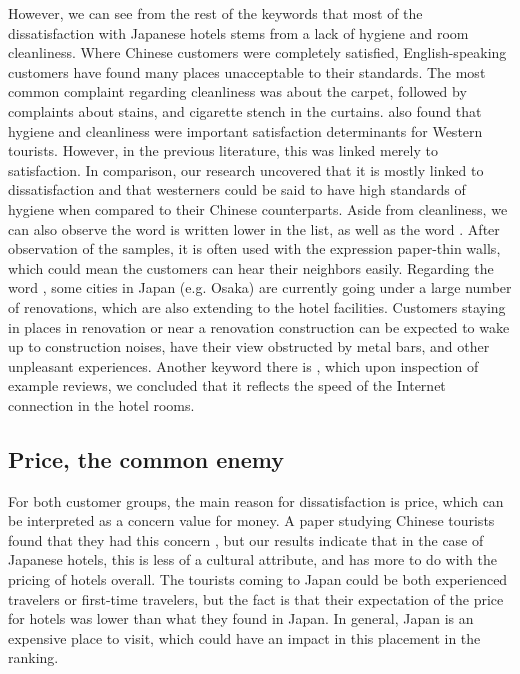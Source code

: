 However, we can see from the rest of the keywords \DIFdelbegin {}\DIFdelend that most of the dissatisfaction with Japanese hotels stems from a lack of hygiene and room cleanliness. Where Chinese customers were completely satisfied, English-speaking customers have found many places unacceptable to their standards. The most common complaint regarding cleanliness was about the carpet, followed by complaints about stains, and cigarette stench in the curtains. \cite{kozak2002} also found that hygiene and cleanliness were important satisfaction determinants for Western tourists. However, in the previous literature, this was linked merely to satisfaction. In comparison, our research uncovered that it is mostly linked to dissatisfaction and that westerners could be said to have high standards of hygiene when compared to their Chinese counterparts. Aside from cleanliness, we can also observe the word \DIFdelbegin {}\DIFdelend \DIFaddbegin {}\DIFaddend is written lower in the list, as well as the word \DIFdelbegin {}\DIFdelend \DIFaddbegin {}\DIFaddend . After observation of the samples, it is often used with the expression \DIFdelbegin {}\DIFdelend \DIFaddbegin {}\DIFaddend paper-thin walls\DIFdelbegin {}\DIFdelend \DIFaddbegin {}\DIFaddend , which could mean the customers can hear their neighbors easily. Regarding the word \DIFdelbegin {}\DIFdelend \DIFaddbegin {}\DIFaddend , some cities in Japan (e.g. Osaka) are currently going under a large number of renovations, which are also extending to the hotel facilities. Customers staying in places in renovation or near a renovation construction can be expected to wake up to construction noises, have their view obstructed by metal bars, and other unpleasant experiences. Another keyword there is \DIFdelbegin {}\DIFdelend \DIFaddbegin {}\DIFaddend , which upon inspection of example reviews, we concluded that it reflects the speed of the Internet connection in the hotel rooms.

\subsection{Price, the common enemy}\label{disc:price}

For both customer groups, the main reason for dissatisfaction is price, which can be interpreted as a concern \DIFdelbegin {}\DIFdelend \DIFaddbegin {}\DIFaddend value for money. A paper studying Chinese tourists found that they had this concern \cite[][]{truong2009}, but our results indicate that in the case of Japanese hotels, this is less of a cultural attribute, and has more to do with the pricing of hotels overall. The tourists coming to Japan could be both experienced travelers or first-time travelers, but the fact is that their expectation of the price for hotels was lower than what they found in Japan. In general, Japan is an expensive place to visit, which could have an impact in this placement in the ranking. 


